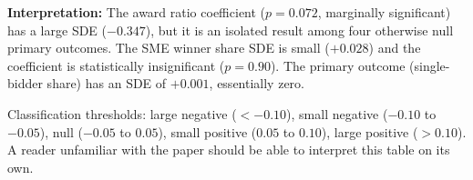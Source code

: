 \documentclass[12pt]{article}
\begin{document}
\begin{table}[H]
{\textbf{Interpretation:} The award ratio coefficient ($p = 0.072$, marginally significant) has a large SDE ($-0.347$), but it is an isolated result among four otherwise null primary outcomes. The SME winner share SDE is small ($+0.028$) and the coefficient is statistically insignificant ($p = 0.90$). The primary outcome (single-bidder share) has an SDE of $+0.001$, essentially zero.

Classification thresholds:
large negative ($< -0.10$), small negative ($-0.10$ to $-0.05$),
null ($-0.05$ to $0.05$), small positive ($0.05$ to $0.10$),
large positive ($> 0.10$).
A reader unfamiliar with the paper should be able to interpret this table
on its own.}
\end{table}
\end{document}
